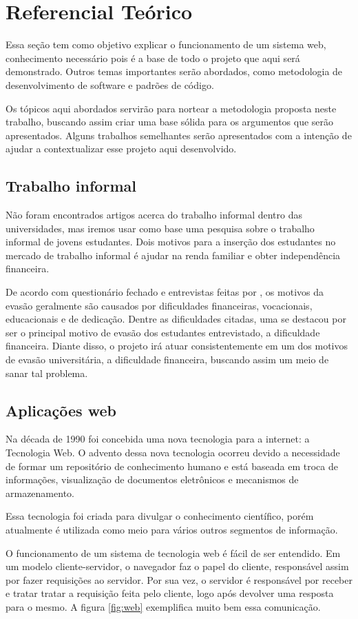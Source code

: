 \chapter{Referencial Teórico}

Essa seção tem como objetivo explicar o funcionamento de um sistema web, conhecimento necessário pois é a base de todo o projeto que aqui será demonstrado. Outros temas importantes serão abordados, como metodologia de desenvolvimento de software e padrões de código. \par
Os tópicos aqui abordados servirão para nortear a metodologia proposta neste trabalho, buscando assim criar uma base sólida para os argumentos que serão apresentados. Alguns trabalhos semelhantes serão apresentados com a intenção de ajudar a contextualizar esse projeto aqui desenvolvido.


\section{Trabalho informal}
Não foram encontrados artigos acerca do trabalho informal dentro das universidades, mas iremos usar como base uma pesquisa sobre o trabalho informal de jovens estudantes. Dois motivos para a inserção dos estudantes no mercado de trabalho informal é ajudar na renda familiar e obter independência financeira\cite{ferreira2009trabalhojovem}. \par
De acordo com questionário fechado e entrevistas feitas por \cite{ribeiro2005evasao}, os motivos da evasão geralmente são causados por dificuldades financeiras, vocacionais, educacionais e de dedicação. Dentre as dificuldades citadas, uma se destacou por ser o principal motivo de evasão dos estudantes entrevistado, a dificuldade financeira. Diante disso, o projeto irá atuar consistentemente em um dos motivos de evasão universitária, a dificuldade financeira, buscando assim um meio de sanar tal problema.

\section{Aplicações web}
\label{sec:trabalhos_correlatos}

Na década de 1990 foi concebida uma nova tecnologia para a internet: a Tecnologia Web\cite{zaneti2005construcao}. O advento dessa nova tecnologia ocorreu devido a necessidade de formar um repositório de conhecimento humano \cite{lee1994www} e está baseada em troca de informações, visualização de documentos eletrônicos e mecanismos de armazenamento. \par
Essa tecnologia foi criada para divulgar o conhecimento científico, porém atualmente é utilizada como meio para vários outros segmentos de informação\cite{zaneti2005construcao}. \par
O funcionamento de um sistema de tecnologia web é fácil de ser entendido. Em um modelo cliente-servidor, o navegador faz o papel do cliente, responsável assim por fazer requisições ao servidor. Por sua vez, o servidor é responsável por receber e tratar tratar a requisição feita pelo cliente, logo após devolver uma resposta para o mesmo\cite{sousa2016desenvolvimento}. A figura \ref{fig:web} exemplifica muito bem essa comunicação.

